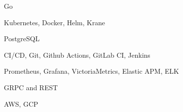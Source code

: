 \item Go
\item Kubernetes, Docker, Helm, Krane
\item PostgreSQL
\item CI/CD, Git, Github Actions, GitLab CI, Jenkins
\item Prometheus, Grafana, VictoriaMetrics, Elastic APM, ELK
\item GRPC and REST
\item AWS, GCP
